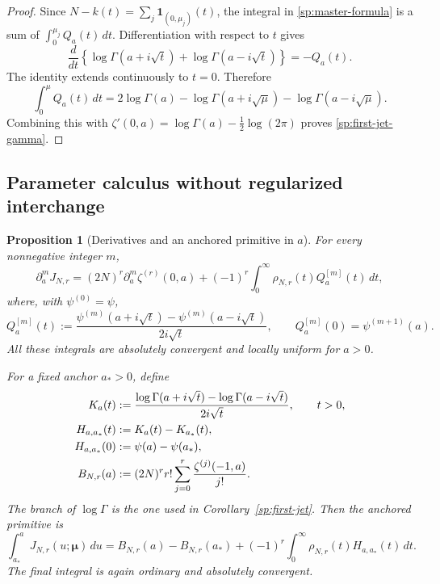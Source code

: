 \documentclass[11pt,letterpaper]{article}
\numberwithin{equation}{section}
\newtheorem{proposition}[theorem]{Proposition}
\theoremstyle{definition}
\theoremstyle{remark}
\begin{document}
\begin{proof}
Since $N-k(t)=\sum_j\boldsymbol1_{(0,\mu_j)}(t)$, the integral
in \eqref{sp:master-formula} is a sum of $\int_0^{\mu_j}Q_a(t)\,dt$.
Differentiation with respect to $t$ gives
\[
 \frac{d}{dt}\left\{
   \log\Gamma(a+i\sqrt t)+\log\Gamma(a-i\sqrt t)\right\}
 =-Q_a(t).
\]
The identity extends continuously to $t=0$.  Therefore
\[
 \int_0^\mu Q_a(t)\,dt
 =2\log\Gamma(a)-\log\Gamma(a+i\sqrt\mu)
                       -\log\Gamma(a-i\sqrt\mu).
\]
Combining this with
$\zeta'(0,a)=\log\Gamma(a)-\tfrac12\log(2\pi)$ proves
\eqref{sp:first-jet-gamma}.
\end{proof}

\subsection{Parameter calculus without regularized interchange}
\label{sp:parameters}

\begin{proposition}[Derivatives and an anchored primitive in $a$]
\label{sp:a-calculus}
For every nonnegative integer $m$,
\begin{equation}
 \partial_a^mJ_{N,r}
 =(2N)^r\partial_a^m\zeta^{(r)}(0,a)
   +(-1)^r\int_0^{\infty}\rho_{N,r}(t)Q_a^{[m]}(t)\,dt,
 \label{sp:a-derivatives}
\end{equation}
where, with $\psi^{(0)}=\psi$,
\begin{equation}
 Q_a^{[m]}(t):=
 \frac{\psi^{(m)}(a+i\sqrt t)-\psi^{(m)}(a-i\sqrt t)}
      {2i\sqrt t},
 \qquad Q_a^{[m]}(0)=\psi^{(m+1)}(a).
 \label{sp:polygamma-kernel}
\end{equation}
All these integrals are absolutely convergent and locally uniform
for $a>0$.

For a fixed anchor $a_*>0$, define
\begin{align}
 K_a(t)&:=\frac{\log\Gamma(a+i\sqrt t)-\log\Gamma(a-i\sqrt t)}
                      {2i\sqrt t},\qquad t>0,\notag\\
 H_{a,a_*}(t)&:=K_a(t)-K_{a_*}(t),
 \label{sp:gamma-kernel}\\
 H_{a,a_*}(0)&:=\psi(a)-\psi(a_*),\notag\\
 B_{N,r}(a)
 &:=(2N)^r r!\sum_{j=0}^{r}\frac{\zeta^{(j)}(-1,a)}{j!}.
 \label{sp:primitive-baseline}
\end{align}
The branch of $\log\Gamma$ is the one used in
Corollary~\ref{sp:first-jet}.  Then the anchored primitive is
\begin{equation}
 \int_{a_*}^{a}J_{N,r}(u;\boldsymbol\mu)\,du
 =B_{N,r}(a)-B_{N,r}(a_*)
     +(-1)^r\int_0^{\infty}
                      \rho_{N,r}(t)H_{a,a_*}(t)\,dt.
 \label{sp:anchored-primitive}
\end{equation}
The final integral is again ordinary and absolutely convergent.
\end{proposition}
\end{document}
